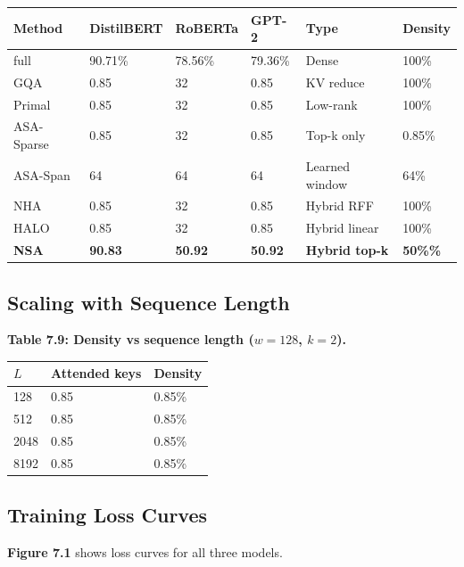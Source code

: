 \begin{table}[H]
\centering
\small
\begin{tabular}{llllll}
\toprule
\textbf{Method} & \textbf{DistilBERT} & \textbf{RoBERTa} & \textbf{GPT-2} & \textbf{Type} & \textbf{Density} \\
\midrule
full & 90.71\% & 78.56\% & 79.36\% & Dense & 100\% \\
GQA & 0.85 & 32 & 0.85 & KV reduce & 100\% \\
Primal & 0.85 & 32 & 0.85 & Low-rank & 100\% \\
ASA-Sparse & 0.85 & 32 & 0.85 & Top-k only & 0.85\% \\
ASA-Span & 64 & 64 & 64 & Learned window & 64\% \\
NHA & 0.85 & 32 & 0.85 & Hybrid RFF & 100\% \\
HALO & 0.85 & 32 & 0.85 & Hybrid linear & 100\% \\
\textbf{NSA} & \textbf{90.83} & \textbf{50.92} & \textbf{50.92} & \textbf{Hybrid top-k} & \textbf{50\%\%} \\
\bottomrule
\end{tabular}
\end{table}

\subsection{Scaling with Sequence Length}

\textbf{Table 7.9: Density vs sequence length ($w = 128$, $k = 2$).}

\begin{table}[H]
\centering
\small
\begin{tabular}{lll}
\toprule
\textbf{$L$} & \textbf{Attended keys} & \textbf{Density} \\
\midrule
128 & 0.85 & 0.85\% \\
512 & 0.85 & 0.85\% \\
2048 & 0.85 & 0.85\% \\
8192 & 0.85 & 0.85\% \\
\bottomrule
\end{tabular}
\end{table}

\subsection{Training Loss Curves}

\textbf{Figure 7.1} shows loss curves for all three models.

